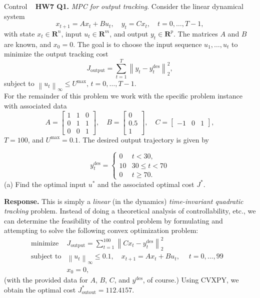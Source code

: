 \begin{chapter}{Control}
    \noindent~\cite{EE364b} \textbf{HW7 Q1.} \textit{MPC for output tracking}. Consider the linear dynamical system
    \[x_{t+1} = Ax_t + Bu_t, \quad y_t = Cx_t, \quad t = 0, \ldots, T-1,\]
    with state $x_t \in \mathbf{R}^n$, input $u_t \in \mathbf{R}^m$, and output $y_t \in \mathbf{R}^p$.
    The matrices $A$ and $B$ are known, and $x_0=0$. The goal is to choose the input sequence $u_1, \ldots, u_t$
    to minimize the output tracking cost
    \[J_{\text{output}} = \sum_{t=1}^{T}\left\lVert y_t - y_t^{\text{des}} \right\rVert_{2}^2,\]
    subject to $\left\lVert u_t \right\rVert_{\infty} \le U^{\text{max}}, \, t=0, \ldots, T-1$. \\
    For the remainder of this problem we work with the specific problem instance with associated data
    \[A = \begin{bmatrix}
        1 & 1 & 0 \\ 0 & 1 & 1 \\ 0 & 0 & 1
    \end{bmatrix}, \quad
    B = \begin{bmatrix}
        0 \\ 0.5 \\ 1
    \end{bmatrix}, \quad
    C = \begin{bmatrix}
        -1 & 0 & 1
    \end{bmatrix},\]
    $T=100$, and $U^{\text{max}} = 0.1$. The desired output trajectory is given by

    \[y^{\text{des}}_t = \begin{cases}
        0 & t < 30, \\
        10 & 30 \le t < 70 \\
        0 & t \ge 70.
    \end{cases}\]
    (a) Find the optimal input $u^*$ and the associated optimal cost $J^*$.
    
    \vspace{.1cm}
    \noindent \textbf{Response.} This is simply a \textit{linear} (in the dynamics) \textit{time-invariant quadratic tracking} problem.
    Instead of doing a theoretical analysis of controllability, etc., we can determine the feasibility
    of the control problem by formulating and attempting to solve the following convex optimization problem:
    \[\begin{array}{lll}
    \text{minimize} \; & J_{\text{output}} = \sum_{t=1}^{100}\left\lVert Cx_t - y_t^{\text{des}} \right\rVert_{2}^2 & \\
    \text{subject to} & \left\lVert u_t \right\rVert_{\infty} \le 0.1, \quad x_{t+1} = Ax_t + Bu_t, \; \quad t = 0, \ldots, 99 & \\
    &x_0 = 0,
    \end{array}\]
    (with the provided data for $A$, $B$, $C$, and $y^{\text{des}}$, of course.) Using CVXPY, we obtain the optimal cost 
    $J_{\text{outout}}^{*} = 112.4157$.


\end{chapter}
